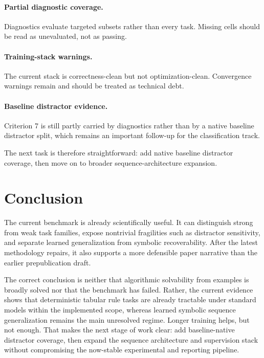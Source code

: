 \documentclass[11pt]{article}
\begin{document}
\paragraph{Partial diagnostic coverage.}
Diagnostics evaluate targeted subsets rather than every task. Missing cells should be read as unevaluated, not as passing.

\paragraph{Training-stack warnings.}
The current stack is correctness-clean but not optimization-clean. Convergence warnings remain and should be treated as technical debt.

\paragraph{Baseline distractor evidence.}
Criterion 7 is still partly carried by diagnostics rather than by a native baseline distractor split, which remains an important follow-up for the classification track.

The next task is therefore straightforward: add native baseline distractor coverage, then move on to broader sequence-architecture expansion.

\section{Conclusion}

The current benchmark is already scientifically useful. It can distinguish strong from weak task families, expose nontrivial fragilities such as distractor sensitivity, and separate learned generalization from symbolic recoverability. After the latest methodology repairs, it also supports a more defensible paper narrative than the earlier prepublication draft.

The correct conclusion is neither that algorithmic solvability from examples is broadly solved nor that the benchmark has failed. Rather, the current evidence shows that deterministic tabular rule tasks are already tractable under standard models within the implemented scope, whereas learned symbolic sequence generalization remains the main unresolved regime. Longer training helps, but not enough. That makes the next stage of work clear: add baseline-native distractor coverage, then expand the sequence architecture and supervision stack without compromising the now-stable experimental and reporting pipeline.
\end{document}
